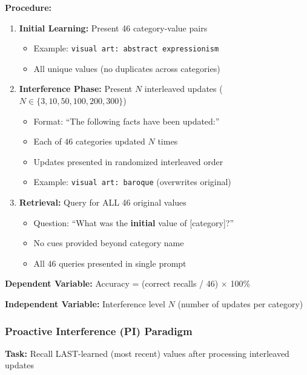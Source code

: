 \documentclass{article}
\begin{document}
\textbf{Procedure:}
\begin{enumerate}[itemsep=4pt,topsep=4pt,parsep=0pt]
    \item \textbf{Initial Learning:} Present 46 category-value pairs
    \begin{itemize}[itemsep=1pt,topsep=2pt,parsep=0pt]
        \item Example: \texttt{visual art: abstract expressionism}
        \item All unique values (no duplicates across categories)
    \end{itemize}
    \item \textbf{Interference Phase:} Present $N$ interleaved updates ($N \in \{3, 10, 50, 100, 200, 300\}$)
    \begin{itemize}[itemsep=1pt,topsep=2pt,parsep=0pt]
        \item Format: ``The following facts have been updated:''
        \item Each of 46 categories updated $N$ times
        \item Updates presented in randomized interleaved order
        \item Example: \texttt{visual art: baroque} (overwrites original)
    \end{itemize}
    \item \textbf{Retrieval:} Query for ALL 46 original values
    \begin{itemize}[itemsep=1pt,topsep=2pt,parsep=0pt]
        \item Question: ``What was the \textbf{initial} value of [category]?''
        \item No cues provided beyond category name
        \item All 46 queries presented in single prompt
    \end{itemize}
\end{enumerate}

\textbf{Dependent Variable:} Accuracy = (correct recalls / 46) $\times$ 100\%

\textbf{Independent Variable:} Interference level $N$ (number of updates per category)

\subsubsection{Proactive Interference (PI) Paradigm}

\textbf{Task:} Recall LAST-learned (most recent) values after processing interleaved updates
\end{document}
